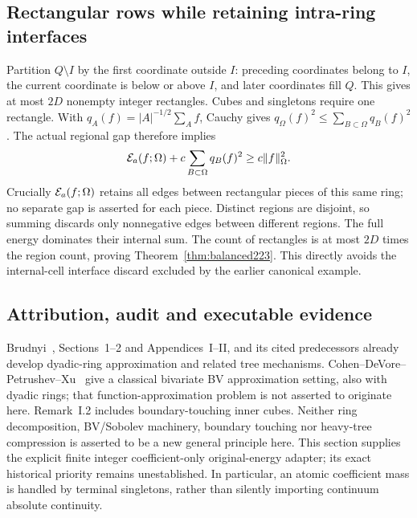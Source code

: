 \subsection{Rectangular rows while retaining intra-ring interfaces}
Partition $Q\setminus I$ by the first coordinate outside $I$: preceding
coordinates belong to $I$, the current coordinate is below or above $I$,
and later coordinates fill $Q$. This gives at most $2D$ nonempty integer
rectangles. Cubes and singletons require one rectangle. With
$q_A(f)=|A|^{-1/2}\sum_A f$, Cauchy gives
$q_\Omega(f)^2\le\sum_{B\subset\Omega}q_B(f)^2$.
The actual regional gap therefore implies
\[
 \mathcal E_a(f;\Omega)+c\sum_{B\subset\Omega}q_B(f)^2\ge c\|f\|_\Omega^2.
\]
Crucially $\mathcal E_a(f;\Omega)$ retains all edges between rectangular pieces
of this same ring; no separate gap is asserted for each piece.
Distinct regions are disjoint, so summing discards only nonnegative edges
between different regions. The full energy dominates their internal sum.
The count of rectangles is at most $2D$ times the region count, proving
Theorem~\ref{thm:balanced223}. This directly avoids the internal-cell
interface discard excluded by the earlier canonical example.

\subsection{Attribution, audit and executable evidence}
Brudnyi~\cite{brudnyi221}, Sections~1--2 and Appendices~I--II, and its cited
predecessors already develop dyadic-ring approximation and related tree
mechanisms. Cohen--DeVore--Petrushev--Xu~\cite{cdpx223} give a classical
bivariate BV approximation setting, also with dyadic rings; that
function-approximation problem is not asserted to originate here. Remark~I.2 includes boundary-touching inner cubes. Neither
ring decomposition, BV/Sobolev machinery, boundary touching nor heavy-tree
compression is asserted to be a new general principle here. This section
supplies the explicit finite integer coefficient-only original-energy
adapter; its exact historical priority remains unestablished. In particular,
an atomic coefficient mass is handled by terminal singletons, rather than
silently importing continuum absolute continuity.

